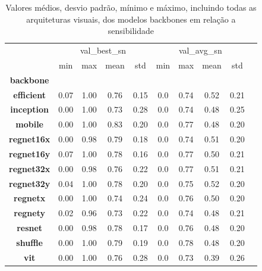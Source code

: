 \begin{table}
\centering
\caption{Valores médios, desvio padrão, mínimo e máximo, incluindo todas as arquiteturas visuais, dos modelos backbones em relação a sensibilidade}
\label{tab:snbackbone}
\begin{tabular}{c|c|c|c|c|c|c|c|c|c}
\toprule
{} & \multicolumn{4}{c|}{val\_best\_sn} & \multicolumn{4}{c|}{val\_avg\_sn} \\
{} &         min &   max &  mean &   std &        min &   max &  mean &   std \\
\textbf{backbone } &             &       &       &       &            &       &       &       \\
\midrule
\textbf{efficient} &        0.07 &  1.00 &  0.76 &  0.15 &        0.0 &  0.74 &  0.52 &  0.21 \\
\textbf{inception} &        0.00 &  1.00 &  0.73 &  0.28 &        0.0 &  0.74 &  0.48 &  0.25 \\
\textbf{mobile   } &        0.00 &  1.00 &  0.83 &  0.20 &        0.0 &  0.77 &  0.48 &  0.20 \\
\textbf{regnet16x} &        0.00 &  0.98 &  0.79 &  0.18 &        0.0 &  0.74 &  0.51 &  0.20 \\
\textbf{regnet16y} &        0.07 &  1.00 &  0.78 &  0.16 &        0.0 &  0.77 &  0.50 &  0.21 \\
\textbf{regnet32x} &        0.00 &  0.98 &  0.76 &  0.22 &        0.0 &  0.77 &  0.51 &  0.21 \\
\textbf{regnet32y} &        0.04 &  1.00 &  0.78 &  0.20 &        0.0 &  0.75 &  0.52 &  0.20 \\
\textbf{regnetx  } &        0.00 &  1.00 &  0.74 &  0.24 &        0.0 &  0.76 &  0.50 &  0.20 \\
\textbf{regnety  } &        0.02 &  0.96 &  0.73 &  0.22 &        0.0 &  0.74 &  0.48 &  0.21 \\
\textbf{resnet   } &        0.00 &  0.98 &  0.78 &  0.17 &        0.0 &  0.76 &  0.48 &  0.20 \\
\textbf{shuffle  } &        0.00 &  1.00 &  0.79 &  0.19 &        0.0 &  0.78 &  0.48 &  0.20 \\
\textbf{vit      } &        0.00 &  1.00 &  0.76 &  0.28 &        0.0 &  0.73 &  0.39 &  0.26 \\
\bottomrule
\end{tabular}
\end{table}
